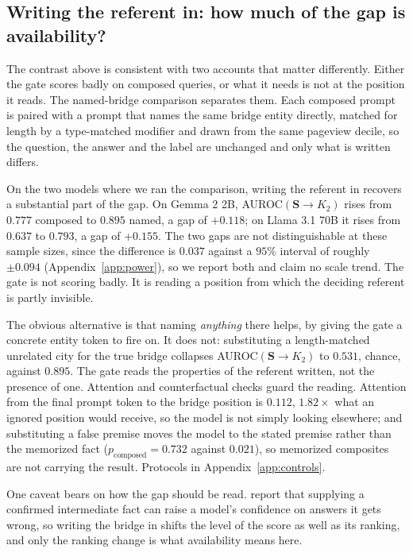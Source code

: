 \documentclass{article}
\newif\ifredflags
\newcommand{\rf}[1]{\ifredflags{\textcolor{red}{\textbf{[MISSING: #1]}}}\fi}
\newcommand{\gate}{\mathbf{S}}
\begin{document}
\subsection{Writing the referent in: how much of the gap is availability?}
\label{sec:res-availability}

The contrast above is consistent with two accounts that matter differently. Either the gate scores
badly on composed queries, or what it needs is not at the position it reads. The named-bridge
comparison separates them. Each composed prompt is paired with a prompt that names the same bridge
entity directly, matched for length by a type-matched modifier and drawn from the same pageview
decile, so the question, the answer and the label are unchanged and only what is written differs.

On the two models where we ran the comparison, writing the referent in recovers a substantial part of
the gap. On Gemma 2 2B,
AUROC$(\gate\!\to\!K_2)$ rises from $0.777$ composed to $0.895$ named, a gap of $+0.118$; on Llama 3.1
70B it rises from $0.637$ to $0.793$, a gap of $+0.155$. The two gaps are not distinguishable at
these sample sizes, since the difference is $0.037$ against a $95\%$ interval of roughly $\pm0.094$
(Appendix~\ref{app:power}), so we report both and claim no scale trend. The gate is not
scoring badly. It is reading a position from which the deciding referent is partly invisible.

The obvious alternative is that naming \emph{anything} there helps, by giving the gate a concrete
entity token to fire on. It does not: substituting a length-matched unrelated city for the true bridge
collapses AUROC$(\gate\!\to\!K_2)$ to $0.531$, chance, against $0.895$. The gate reads the properties
of the referent written, not the presence of one. Attention and counterfactual checks guard the reading. Attention
from the final prompt token to the bridge position is $0.112$, $1.82\times$ what an ignored position
would receive, so the model is not simply looking elsewhere; and substituting a false premise moves
the model to the stated premise rather than the memorized fact
($p_{\mathrm{composed}}=0.732$ against $0.021$), so memorized composites are not carrying the result.
Protocols in Appendix~\ref{app:controls}.

One caveat bears on how the gap should be read. \citet{lathkar2026anchored} report that supplying a
confirmed intermediate fact can raise a model's confidence on answers it gets wrong, so writing the
bridge in shifts the level of the score as well as its ranking, and only the ranking change is what
availability means here. \rf{the score-level shift between the composed and named-bridge conditions
alongside the AUROC change.}
\end{document}
